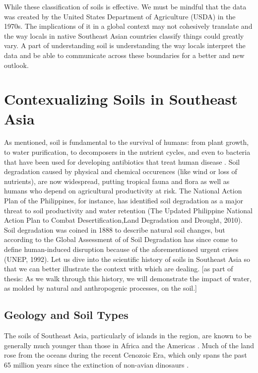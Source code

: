 While these classification of soils is effective. We must be mindful that the data was created by the United States Department of Agriculture (USDA) in the 1970s. The implications of it in a global context may not cohesively translate and the way locals in native Southeast Asian countries classify things could greatly vary. A part of understanding soil is understanding the way locals interpret the data and be able to communicate across these boundaries for a better and new outlook.


\section{Contexualizing Soils in Southeast Asia}

As mentioned, soil is fundamental to the survival of humans: from plant growth, to water purification, to decomposers in the nutrient cycles, and even to bacteria that have been used for developing antibiotics that treat human disease \citep{asio2006morphology}. Soil degradation caused by physical and chemical occurences (like wind or loss of nutrients), are now widespread, putting tropical fauna and flora as well as humans who depend on agricultural productivity at risk. The National Action Plan of the Philippines, for instance, has identified soil degradation as a major threat to soil productivity and water retention (The Updated Philippine National Action Plan to Combat Desertification,Land Degradation and Drought, 2010). Soil degradation was coined in 1888 to describe natural soil changes, but according to the Global Assessment of of Soil Degradation has since come to define human-induced disruption because of the aforementioned urgent crises (UNEP, 1992). Let us dive into the scientific history of soils in Southeast Asia so that we can better illustrate the context with which are dealing. [as part of thesis: As we walk through this history, we will demonstrate the impact of water, as molded by natural and anthropogenic processes, on the soil.]

\subsection{Geology and Soil Types}

The soils of Southeast Asia, particularly of islands in the region, are known to be generally much younger than those in Africa and the Americas \citep{juo2003tropical}. Much of the land rose from the oceans during the recent Cenozoic Era, which only spans the past 65 million years since the extinction of non-avian dinosaurs \citep{hall2002cenozoic}. 

